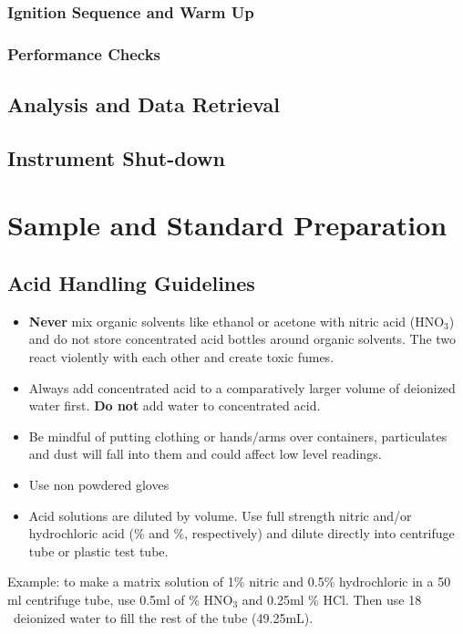 \documentclass[12pt]{../SOP4_alpha}\usepackage[]{graphicx}\usepackage[]{color}
\begin{document}
\subsubsection{Ignition Sequence and Warm Up}

\subsubsection{Performance Checks}

\subsection{Analysis and Data Retrieval}

\subsection{Instrument Shut-down}

\section{Sample and Standard Preparation}

\subsection{Acid Handling Guidelines}

\begin{itemize}
  \item \textbf{Never} mix organic solvents like ethanol or acetone with nitric acid (HNO$_3$) and do not store concentrated acid bottles around organic solvents. The two react violently with each other and create toxic fumes.
  \item Always add concentrated acid to a comparatively larger volume of deionized water first. \textbf{Do not} add water to concentrated acid.
  \item Be mindful of putting clothing or hands/arms over containers, particulates and dust will fall into them and could affect low level readings.
  \item Use non powdered gloves
  \item Acid solutions are diluted by volume. Use full strength nitric and/or hydrochloric
acid (\% and \%, respectively) and dilute directly into centrifuge tube or plastic test tube.
\end{itemize}

\NP Example: to make a matrix solution of 1\% nitric and 0.5\% hydrochloric in a 50 ml centrifuge tube, use 0.5ml of \% HNO$_3$ and 0.25ml \% HCl. Then use 18 \ohm \ deionized water to fill the rest of the tube (49.25mL). 
\end{document}
